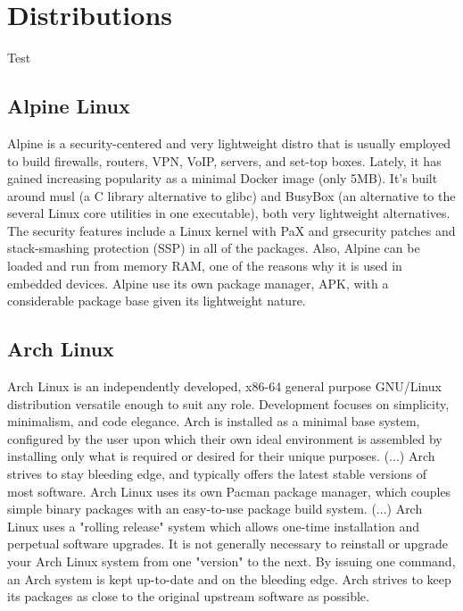 \chapter{Distributions}
\label{cha:distributions}

Test

\section{Alpine Linux}
\label{sec:distributions_alpine_linux}

Alpine is a security-centered and very lightweight distro that is usually employed
to build firewalls, routers, VPN, VoIP, servers, and set-top boxes. Lately, it
has gained increasing popularity as a minimal Docker image (only 5MB). It's built
around musl (a C library alternative to glibc) and BusyBox (an alternative to
the several Linux core utilities in one executable), both very lightweight
alternatives. The security features include a Linux kernel with PaX and grsecurity
patches and stack-smashing protection (SSP) in all of the packages. Also, Alpine
can be loaded and run from memory RAM, one of the reasons why it is used in
embedded devices. Alpine use its own package manager, APK, with a considerable package
base given its lightweight nature\cite{alpine_linux}.

\section{Arch Linux}
\label{sec:distributions_arch_linux}

Arch Linux is an independently developed, x86-64 general purpose GNU/Linux
distribution versatile enough to suit any role. Development focuses on simplicity,
minimalism, and code elegance. Arch is installed as a minimal base system, configured
by the user upon which their own ideal environment is assembled by installing only
what is required or desired for their unique purposes. (...) Arch strives to
stay bleeding edge, and typically offers the latest stable versions of most software.
Arch Linux uses its own Pacman package manager, which couples simple binary packages
with an easy-to-use package build system. (...) Arch Linux uses a "rolling release"
system which allows one-time installation and perpetual software upgrades. It is
not generally necessary to reinstall or upgrade your Arch Linux system from one "version"
to the next. By issuing one command, an Arch system is kept up-to-date and on the
bleeding edge. Arch strives to keep its packages as close to the original
upstream software as possible\cite{arch_linux}.
